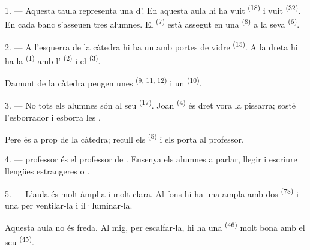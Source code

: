 \VUsaut{2.0mm}
\VUsaut{3.2mm}
\VUsaut{2.6mm}
\VUsaut{3.4mm}
\VUornamento{9pt}
\VUsaut{5.0mm}
\VUsaut{3.0mm}
\VUfilet{16mm}
\VUsaut{5.6mm}

\VUsaut{1.4mm}
\VUsaut{2.2mm}
\VUfilet{20mm}
\VUsaut{6.4mm}

\VUsaut{3.0mm}

1. --- Aquesta taula representa una  d'. En
aquesta aula hi ha vuit  \textsuperscript{(18)} i vuit
 \textsuperscript{(32)}. En cada banc s'asseuen tres alumnes. El
 \textsuperscript{(7)} està assegut en una 
\textsuperscript{(8)} a la seva  \textsuperscript{(6)}.

2. --- A l'esquerra de la càtedra hi ha un  amb portes de vidre
\textsuperscript{(15)}. A la dreta hi ha la 
\textsuperscript{(1)} amb l' \textsuperscript{(2)} i el
 \textsuperscript{(3)}.

Damunt de la càtedra pengen unes 
\textsuperscript{(9, 11, 12)} i un  \textsuperscript{(10)}.

3. --- No tots els alumnes són al seu  \textsuperscript{(17)}. Joan
\textsuperscript{(4)} és dret vora la pissarra; sosté l'esborrador i esborra les
.

Pere és a prop de la càtedra; recull els 
\textsuperscript{(5)} i els porta al professor.

4. ---  professor és el professor de .
Ensenya els alumnes a parlar, llegir i escriure llengües estrangeres
 o .

5. --- L'aula és molt àmplia i molt clara. Al fons hi ha una 
ampla amb dos  \textsuperscript{(78)} i una  per ventilar-la i il·luminar-la.

Aquesta aula no és freda. Al mig, per escalfar-la, hi ha una 
\textsuperscript{(46)} molt bona amb el seu  \textsuperscript{(45)}.

